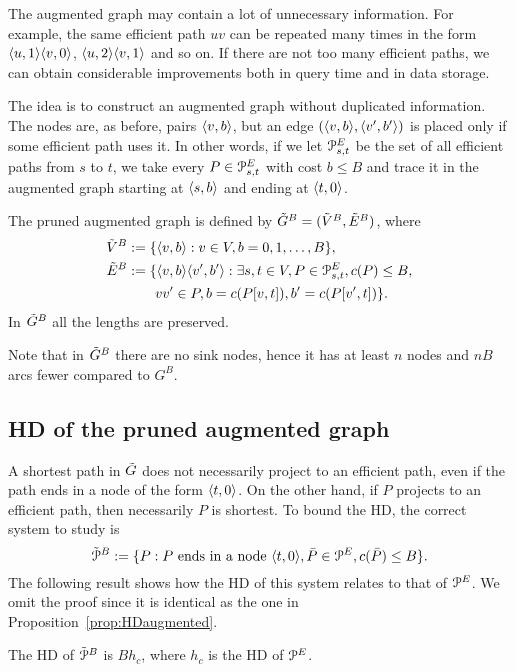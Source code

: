 
The augmented graph may contain a lot of unnecessary information.
For example, the same efficient path $uv$ can be repeated many times in the form $\langle u,1\rangle\langle v,0\rangle$, $\langle u,2\rangle\langle v,1\rangle$ and so on.
If there are not too many efficient paths, we can obtain considerable improvements both in query time and in data storage.

The idea is to construct an augmented graph without duplicated information.
The nodes are, as before, pairs $\langle v,b\rangle$, but an edge $(\langle v,b\rangle,\langle v',b'\rangle)$ is placed only if some efficient path uses it.
In other words, if we let $\mathcal{P}_{s,t}^E$ be the set of all efficient paths from $s$ to $t$, we take every $P\in \mathcal{P}_{s,t}^E$ with cost $b\leq B$ and trace it in the augmented graph starting at $\langle s,b\rangle$ and ending at $\langle t,0\rangle$.

\begin{definition}
The pruned augmented graph is defined by $\tilde G^B=(\tilde V^B,\tilde E^B)$, where
\begin{align*}
\tilde V^B &:=\{\langle v,b\rangle: v\in V, b=0,1,\ldots,B\},\\
\tilde E^B &:=\{\langle v,b\rangle\langle v',b'\rangle : \exists s,t\in V, P\in\mathcal{P}^E_{s,t}, c(P)\leq B, \\
&\qquad vv'\in P, b=c(P[v,t]), b'=c(P[v',t])  \}.
\end{align*}
In $\tilde G^B$ all the lengths are preserved.
\end{definition}
Note that in $\tilde G^B$ there are no sink nodes, hence it has at least $n$ nodes and $nB$ arcs fewer compared to $G^B$.

\subsection{HD of the pruned augmented graph}

A shortest path in $\tilde G$ does not necessarily project to an efficient path, even if the path ends in a node of the form $\langle t,0\rangle$.
On the other hand, if $P$ projects to an efficient path, then necessarily $P$ is shortest. 
To bound the HD, the correct system to study is
\[
\tilde{\mathcal{P}}^B:=\{P: P\text{ ends in a node }\langle t,0\rangle, \bar P\in \mathcal{P}^E, c(\bar P)\leq B \}.
\]
The following result shows how the HD of this system relates to that of $\mathcal{P}^E$.
We omit the proof since it is identical as the one in Proposition~\ref{prop:HDaugmented}.
\begin{proposition}
The HD of $\tilde{\mathcal{P}}^B$ is $Bh_c$, where $h_c$ is the HD of $\mathcal{P}^E$.
\end{proposition}

